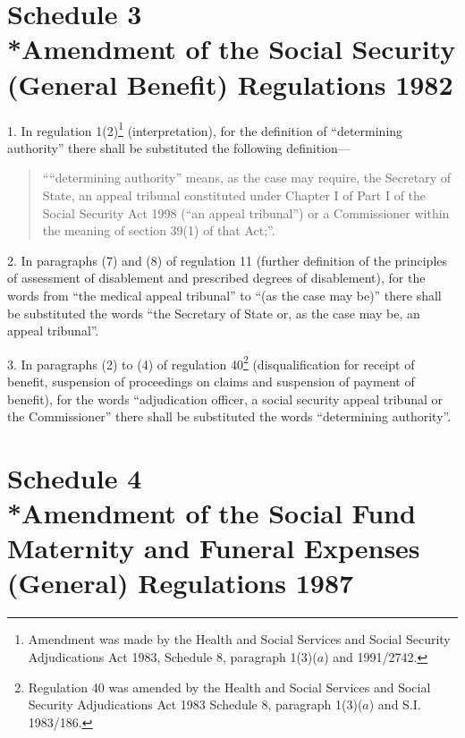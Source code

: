 \documentclass[12pt,a4paper]{article}
\begin{document}
\part[Schedule 3 --- Amendment of the Social Security (General Benefit) Regulations 1982]{Schedule 3\\*Amendment of the Social Security (General Benefit) Regulations 1982}

\renewcommand\parthead{--- Schedule 3}

1.  In regulation 1(2)\footnote{\frenchspacing Amendment was made by the Health and Social Services and Social Security Adjudications Act 1983, Schedule 8, paragraph 1(3)($a$) and 1991/2742.} (interpretation), for the definition of “determining authority” there shall be substituted the following definition---
\begin{quotation}
    ““determining authority” means, as the case may require, the Secretary of State, an appeal tribunal constituted under Chapter I of Part I of the Social Security Act 1998 (“an appeal tribunal”) or a Commissioner within the meaning of section 39(1) of that Act;”. 
\end{quotation}

\medskip

2.  In paragraphs (7) and (8) of regulation 11 (further definition of the principles of assessment of disablement and prescribed degrees of disablement), for the words from “the medical appeal tribunal” to “(as the case may be)” there shall be substituted the words “the Secretary of State or, as the case may be, an appeal tribunal”.

\medskip

3.  In paragraphs (2) to (4) of regulation 40\footnote{\frenchspacing Regulation 40 was amended by the Health and Social Services and Social Security Adjudications Act 1983 Schedule 8, paragraph 1(3)($a$) and S.I. 1983/186.} (disqualification for receipt of benefit, suspension of proceedings on claims and suspension of payment of benefit), for the words “adjudication officer, a social security appeal tribunal or the Commissioner” there shall be substituted the words “determining authority”.

\part[Schedule 4 --- Amendment of the Social Fund Maternity and Funeral Expenses (General) Regulations 1987]{Schedule 4\\*Amendment of the Social Fund Maternity and Funeral Expenses (General) Regulations 1987}
\end{document}
